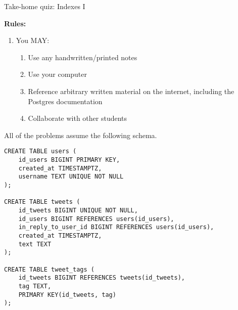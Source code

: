 \documentclass[12pt]{exam}
\theoremstyle{definition}
\begin{document}
\begin{center}
    {
\Large
    Take-home quiz: Indexes I
}
\end{center}

\noindent
\vspace{0.2in}
\noindent
\textbf{Rules:}
\begin{enumerate}
    \item You MAY:
        \begin{enumerate}
            \item Use any handwritten/printed notes
            \item Use your computer
            \item Reference arbitrary written material on the internet, including the Postgres documentation
            \item Collaborate with other students
        \end{enumerate}
\end{enumerate}
\newpage



\noindent
All of the problems assume the following schema.
\begin{lstlisting}
CREATE TABLE users (
    id_users BIGINT PRIMARY KEY,
    created_at TIMESTAMPTZ,
    username TEXT UNIQUE NOT NULL
);

CREATE TABLE tweets (
    id_tweets BIGINT UNIQUE NOT NULL,
    id_users BIGINT REFERENCES users(id_users),
    in_reply_to_user_id BIGINT REFERENCES users(id_users),
    created_at TIMESTAMPTZ,
    text TEXT
);

CREATE TABLE tweet_tags (
    id_tweets BIGINT REFERENCES tweets(id_tweets),
    tag TEXT,
    PRIMARY KEY(id_tweets, tag)
);
\end{lstlisting}
\end{document}
